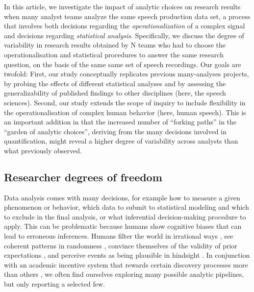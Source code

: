 \documentclass[Review,times,sageh]{sagej}
\begin{document}
In this article, we investigate the impact of analytic choices on
research results when many analyst teams analyze the same speech
production data set, a process that involves both decisions regarding
the \emph{operationalization} of a complex signal and decisions
regarding \emph{statistical analysis}. Specifically, we discuss the
degree of variability in research results obtained by N teams who had to
choose the operationalisation and statistical procedures to answer the
same research question, on the basis of the same same set of speech
recordings. Our goals are twofold: First, our study conceptually
replicates previous many-analyses projects, by probing the effects of
different statistical analyses and by assessing the generalizability of
published findings to other disciplines (here, the speech sciences).
Second, our study extends the scope of inquiry to include flexibility in
the operationalisation of complex human behavior (here, human speech).
This is an important addition in that the increased number of ``forking
paths'' in the ``garden of analytic choices'', deriving from the many
decisions involved in quantification, might reveal a higher degree of
variability across analysts than what previously observed.

\subsection{Researcher degrees of
freedom}\label{researcher-degrees-of-freedom}

Data analysis comes with many decisions, for example how to measure a
given phenomenon or behavior, which data to submit to statistical
modeling and which to exclude in the final analysis, or what inferential
decision-making procedure to apply. This can be problematic because
humans show cognitive biases that can lead to erroneous inferences.
Humans filter the world in irrational ways
\citep[e.g.,][]{tversky1974judgment}, see coherent patterns in
randomness \citep{brugger2001}, convince themselves of the validity of
prior expectations \citep[``I knew it'',][]{nickerson1998confirmation},
and perceive events as being plausible in hindsight \citep[``I knew it
all along'',][]{fischhoff1975hindsight}. In conjunction with an academic
incentive system that rewards certain discovery processes more than
others \citep{sterling1959publication, koole2012rewarding}, we often
find ourselves exploring many possible analytic pipelines, but only
reporting a selected few.
\end{document}
